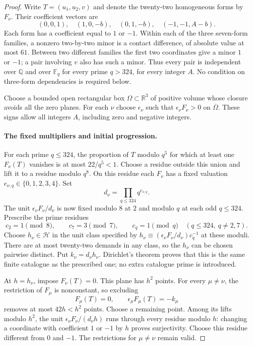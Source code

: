 \documentclass[11pt]{article}
\theoremstyle{definition}
\theoremstyle{remark}
\begin{document}
\begin{proof}
Write $T=(u_1,u_2,v)$ and denote the twenty-two homogeneous forms by
$F_\nu$. Their coefficient vectors are
\[
 (0,0,1),\quad (1,0,-b),\quad(0,1,-b),\quad(-1,-1,A-b).
\]
Each form has a coefficient equal to $1$ or $-1$. Within each of the
three seven-form families, a nonzero two-by-two minor is a contact
difference, of absolute value at most $61$. Between two different
families the first two coordinates give a minor $1$ or $-1$; a pair
involving $v$ also has such a minor. Thus every pair is independent
over $\mathbb Q$ and over $\mathbb F_q$ for every prime $q>324$,
for every integer $A$. No condition on three-form dependencies is
required below.

Choose a bounded open rectangular box $\Omega\subset\mathbb R^3$
of positive volume whose closure avoids all the zero planes. For each
$\nu$ choose $\epsilon_\nu$ such that $\epsilon_\nu F_\nu>0$ on
$\overline\Omega$. These signs allow all integers $A$, including zero
and negative integers.

\paragraph{The fixed multipliers and initial progression.}
For each prime $q\le324$, the proportion of $T$ modulo $q^5$ for
which at least one $F_\nu(T)$ vanishes is at most $22/q^5<1$.
Choose a residue outside this union and lift it to a residue modulo
$q^8$. On this residue each $F_\nu$ has a fixed valuation
$e_{\nu,q}\in\{0,1,2,3,4\}$. Set
\[
 d_\nu=\prod_{q\le324}q^{e_{\nu,q}}.
\]
The unit $\epsilon_\nu F_\nu/d_\nu$ is now fixed modulo $8$ at
$2$ and modulo $q$ at each odd $q\le324$. Prescribe the prime
residues
\[
 c_2=1\pmod8,\qquad c_7=3\pmod7,\qquad
 c_q=1\pmod q\quad(q\le324,\ q\ne2,7).
\]
Choose $h_\nu\in\mathcal H$ in the unit class specified by
$h_\nu\equiv(\epsilon_\nu F_\nu/d_\nu)c_q^{-1}$ at these
moduli. There are at most twenty-two demands in any class, so the
$h_\nu$ can be chosen pairwise distinct. Put $k_\nu=d_\nu h_\nu$.
Dirichlet's theorem proves that this is the same finite catalogue as
the prescribed one; no extra catalogue prime is introduced.

At $h=h_\nu$, impose $F_\nu(T)=0$. This plane has $h^2$ points.
For every $\mu\ne\nu$, the restriction of $F_\mu$ is nonconstant,
so excluding
\[
 F_\mu(T)=0,\qquad \epsilon_\mu F_\mu(T)=-k_\mu
\]
removes at most $42h<h^2$ points. Choose a remaining point.
Among its lifts modulo $h^2$, the unit
$\epsilon_\nu F_\nu/(d_\nu h)$ runs through every residue
modulo $h$: changing a coordinate with coefficient $1$ or $-1$
by $h$ proves surjectivity. Choose this residue different from $0$
and $-1$. The restrictions for $\mu\ne\nu$ remain valid.


\end{proof}
\end{document}
